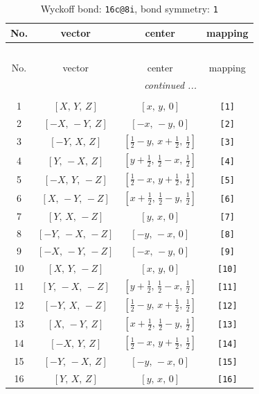 \documentclass[fleqn,8pt]{jsarticle}
\begin{document}
\begin{longtable}{cccc}
\caption{Wyckoff bond: {\tt 16c@8i}, bond symmetry: {\tt 1}}
 \\
 \hline \hline
No. & vector & center & mapping \\ \hline \endfirsthead

\multicolumn{3}{l}{\tablename\ \thetable{}} \\
 \hline \hline
No. & vector & center & mapping \\ \hline \endhead

 \hline \hline
\multicolumn{3}{r}{\footnotesize\it continued ...} \\ \endfoot

 \hline \hline
\multicolumn{3}{r}{} \\ \endlastfoot

1 & $\left[ X,\, Y,\, Z \right]$ & $\left[ x,\, y,\, 0 \right]$ & {\tt [1]} \\ \hline
2 & $\left[ - X,\, - Y,\, Z \right]$ & $\left[ - x,\, - y,\, 0 \right]$ & {\tt [2]} \\ \hline
3 & $\left[ - Y,\, X,\, Z \right]$ & $\left[ \frac{1}{2} - y,\, x + \frac{1}{2},\, \frac{1}{2} \right]$ & {\tt [3]} \\ \hline
4 & $\left[ Y,\, - X,\, Z \right]$ & $\left[ y + \frac{1}{2},\, \frac{1}{2} - x,\, \frac{1}{2} \right]$ & {\tt [4]} \\ \hline
5 & $\left[ - X,\, Y,\, - Z \right]$ & $\left[ \frac{1}{2} - x,\, y + \frac{1}{2},\, \frac{1}{2} \right]$ & {\tt [5]} \\ \hline
6 & $\left[ X,\, - Y,\, - Z \right]$ & $\left[ x + \frac{1}{2},\, \frac{1}{2} - y,\, \frac{1}{2} \right]$ & {\tt [6]} \\ \hline
7 & $\left[ Y,\, X,\, - Z \right]$ & $\left[ y,\, x,\, 0 \right]$ & {\tt [7]} \\ \hline
8 & $\left[ - Y,\, - X,\, - Z \right]$ & $\left[ - y,\, - x,\, 0 \right]$ & {\tt [8]} \\ \hline
9 & $\left[ - X,\, - Y,\, - Z \right]$ & $\left[ - x,\, - y,\, 0 \right]$ & {\tt [9]} \\ \hline
10 & $\left[ X,\, Y,\, - Z \right]$ & $\left[ x,\, y,\, 0 \right]$ & {\tt [10]} \\ \hline
11 & $\left[ Y,\, - X,\, - Z \right]$ & $\left[ y + \frac{1}{2},\, \frac{1}{2} - x,\, \frac{1}{2} \right]$ & {\tt [11]} \\ \hline
12 & $\left[ - Y,\, X,\, - Z \right]$ & $\left[ \frac{1}{2} - y,\, x + \frac{1}{2},\, \frac{1}{2} \right]$ & {\tt [12]} \\ \hline
13 & $\left[ X,\, - Y,\, Z \right]$ & $\left[ x + \frac{1}{2},\, \frac{1}{2} - y,\, \frac{1}{2} \right]$ & {\tt [13]} \\ \hline
14 & $\left[ - X,\, Y,\, Z \right]$ & $\left[ \frac{1}{2} - x,\, y + \frac{1}{2},\, \frac{1}{2} \right]$ & {\tt [14]} \\ \hline
15 & $\left[ - Y,\, - X,\, Z \right]$ & $\left[ - y,\, - x,\, 0 \right]$ & {\tt [15]} \\ \hline
16 & $\left[ Y,\, X,\, Z \right]$ & $\left[ y,\, x,\, 0 \right]$ & {\tt [16]} \\
\end{longtable}
\end{document}
